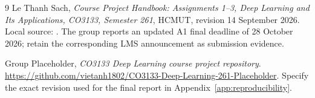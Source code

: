{}
\begin{thebibliography}{9}
Le Thanh Sach, \emph{Course Project Handbook: Assignments 1--3, Deep Learning
and Its Applications, CO3133, Semester 261}, HCMUT, revision 14 September 2026.
Local source: .
The group reports an updated A1 final deadline of 28 October 2026;
retain the corresponding LMS announcement as submission evidence.

Group Placeholder, \emph{CO3133 Deep Learning course project repository}.
\url{https://github.com/vietanh1802/CO3133-Deep-Learning-261-Placeholder}.
Specify the exact revision used for the final report in Appendix~\ref{app:reproducibility}.
\end{thebibliography}
